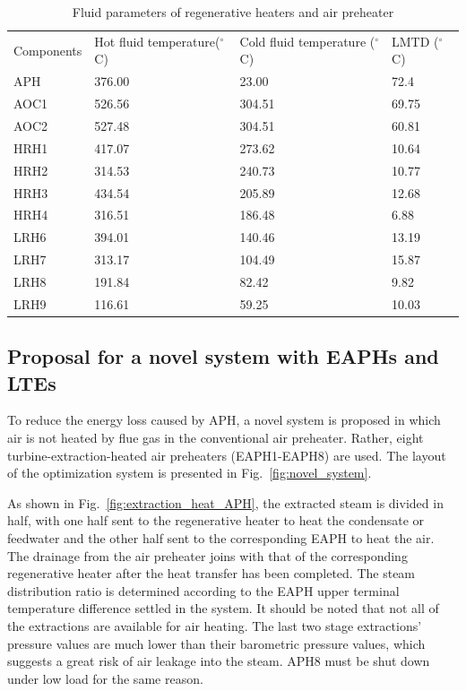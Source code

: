 \documentclass[preprint,12pt]{elsarticle}
\begin{document}
\begin{table}[htbp]
\caption{Fluid parameters of regenerative heaters and air preheater} %
\label{tab:reheater parameter}
\centering
\begin{tabular}{llll}
\toprule 
\multirow{2}{2cm}{Components} &\multirow{2}{2.7cm}{Hot fluid temperature($^\circ$C)}  & \multirow{2}{3.2cm}{Cold fluid temperature ($^\circ$C)}&\multirow{2}{2.2cm}{LMTD ($^\circ$C)}\tabularnewline
&&&\tabularnewline
\midrule
APH  &  376.00 	& 23.00  & 72.4\tabularnewline
AOC1 &   526.56 & 304.51 & 69.75\tabularnewline
AOC2 &  527.48 	& 304.51 & 60.81\tabularnewline
HRH1 &   417.07 & 273.62 & 10.64\tabularnewline
HRH2 &   314.53 & 240.73 & 10.77\tabularnewline
HRH3 &   434.54 & 205.89 & 12.68\tabularnewline
HRH4 &   316.51 & 186.48 & 6.88\tabularnewline
LRH6 &  394.01 	& 140.46 & 13.19\tabularnewline
LRH7 &   313.17 & 104.49 & 15.87\tabularnewline
LRH8 &   191.84 & 82.42  & 9.82\tabularnewline
LRH9 &   116.61 & 59.25  & 10.03\tabularnewline
\bottomrule
\end{tabular}
\end{table}




\subsection{Proposal for a novel system with EAPHs and LTEs}
\label{sub2:prop novel sys}

To reduce the energy loss caused by APH, a novel system is proposed in which air is not heated by flue gas in the conventional air preheater. Rather, eight turbine-extraction-heated air preheaters (EAPH1-EAPH8) are used.
The layout of the optimization system is presented in Fig.~\ref{fig:novel_system}.

As shown in Fig.~\ref{fig:extraction_heat_APH}, the extracted steam is divided in half, with one half sent to the regenerative heater to heat the condensate or feedwater and the other half sent to the corresponding EAPH to heat the air.
The drainage from the air preheater joins with that of the corresponding regenerative heater after the heat transfer has been completed.
The steam distribution ratio is determined according to the EAPH upper terminal temperature difference settled in the system.
It should be noted that not all of the extractions are available for air heating.
The last two stage extractions' pressure values are much lower than their barometric pressure values, which suggests a great risk of air leakage into the steam. APH8 must be shut down under low load for the same reason.
\end{document}
